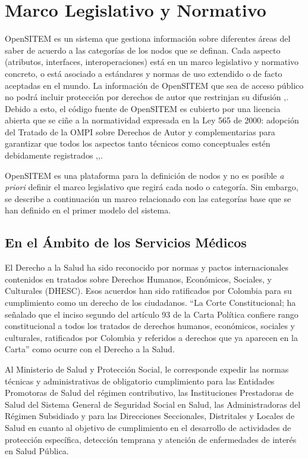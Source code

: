 \section{Marco Legislativo y Normativo}

OpenSITEM es un sistema que gestiona información sobre diferentes áreas del saber de acuerdo a las categorías de los nodos que se definan. Cada aspecto (atributos, interfaces, interoperaciones) está en un marco legislativo y normativo concreto, o está asociado a estándares y normas de uso extendido o de facto aceptadas en el mundo. La información de OpenSITEM que sea de acceso público no podrá incluir protección por derechos de autor que restrinjan su difusión \cite{congreso565},\cite{congreso23}. Debido a esto, el código fuente de OpenSITEM es cubierto por una licencia abierta que se ciñe a la normatividad expresada en la Ley 565 de 2000: adopción del Tratado de la OMPI sobre Derechos de Autor y complementarias para garantizar que todos los aspectos tanto técnicos como conceptuales estén debidamente registrados \cite{congreso565},\cite{congreso44},\cite{congreso1360}. 

OpenSITEM es una plataforma para la definición de nodos y no es posible \textit{a priori} definir el marco legislativo que regirá cada nodo o categoría. Sin embargo, se describe a continuación un marco relacionado con las categorías base que se han definido en el primer modelo del sistema.

\subsection{En el Ámbito de los Servicios Médicos}

El Derecho a la Salud ha sido reconocido por normas y pactos internacionales contenidos en tratados sobre Derechos Humanos, Económicos, Sociales, y Culturales  (DHESC). Esos acuerdos han sido ratificados por Colombia para su cumplimiento como un derecho de los ciudadanos. “La Corte Constitucional; ha señalado que el inciso segundo del artículo 93 de la Carta Política confiere rango constitucional a todos los tratados de derechos humanos, económicos,  sociales y culturales, ratificados por Colombia y referidos a derechos que ya aparecen en la Carta” \cite{sentencia1319} como ocurre con el Derecho a la Salud. 

Al Ministerio de Salud y Protección Social, le corresponde expedir las normas técnicas y administrativas de obligatorio cumplimiento para las Entidades Promotoras de Salud del régimen contributivo, las Instituciones Prestadoras de Salud del Sistema General de Seguridad Social en Salud, las Administradoras del Régimen Subsidiado y para las Direcciones Seccionales, Distritales y Locales de Salud en cuanto al objetivo de cumplimiento en el desarrollo de actividades de protección específica, detección temprana y atención de enfermedades de interés en Salud Pública. 

